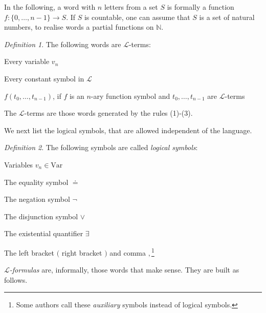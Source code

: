 \documentclass[a4paper, 11pt]{amsart}
\theoremstyle{remark}
\newtheorem{definition}[definition]{Definition}
\newcommand{\NN}{\mathbb{N}}
\newcommand{\cL}{\mathcal L}
\newcommand{\Var}{\mathrm{Var}}
\newenvironment{enumerate-(1)}{\begin{enumerate}[label={\upshape (\arabic*)}, leftmargin=2pc]}{\end{enumerate}}
\begin{document}
In the following, a word with $n$ letters from a set $S$ is formally a function $f\colon \{0,\dots,{n-1}\}\rightarrow S$. 
If $S$ is countable, one can assume that $S$ is a set of natural numbers, to realise words a partial functions on $\NN$. 

\begin{definition} 
The following words are $\cL$-terms: 
\begin{enumerate-(1)} 
\item 
Every variable $v_n$ 
\item 
Every constant symbol in $\cL$ 
\item 
$f(t_0,\dots,t_{n-1})$, if $f$ is an $n$-ary function symbol and $t_0,\dots,t_{n-1}$ are $\cL$-terms 
\end{enumerate-(1)} 
The $\cL$-terms are those words generated by the rules (1)-(3).
\end{definition} 

We next list the logical symbols, that are allowed independent of the language. 

\begin{definition} 
The following symbols are called \emph{logical symbols}: 
\begin{enumerate-(1)} 
\item 
Variables $v_n\in \Var$ 
\item 
The equality symbol $\doteq$ 
\item 
The negation symbol $\neg$ 
\item 
The disjunction symbol $\vee$ 
\item 
The existential quantifier $\exists$ 
\item 
The left bracket $($ right bracket $)$ and comma $,$\footnote{Some authors call these \emph{auxiliary} symbols instead of logical symbols.} 
\end{enumerate-(1)} 
\end{definition} 

\emph{$\cL$-formulas} are, informally, those words that make sense. 
They are built as follows. 
\end{document}
